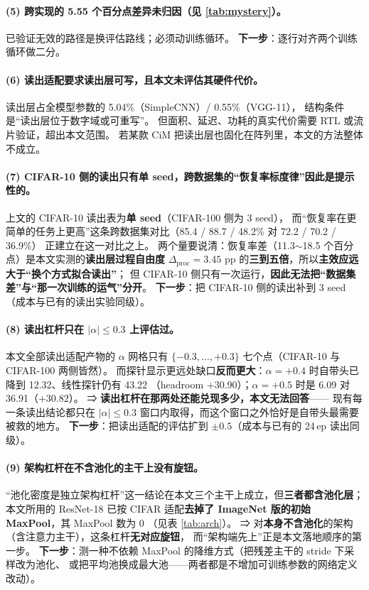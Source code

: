 \documentclass[11pt,a4paper]{ctexart}
\begin{document}
\paragraph{(5) 跨实现的 5.55 个百分点差异未归因（见 \cref{tab:mystery}）。}
已验证无效的路径是换评估路线；必须动训练循环。
\textbf{下一步}：逐行对齐两个训练循环做二分。

\paragraph{(6) 读出适配要求读出层可写，且本文未评估其硬件代价。}
读出层占全模型参数的 5.04\%（SimpleCNN）/ 0.55\%（VGG-11），
结构条件是“读出层位于数字域或可重写”。
但面积、延迟、功耗的真实代价需要 RTL 或流片验证，超出本文范围。
若某款 CiM 把读出层也固化在阵列里，本文的方法整体不成立。

\paragraph{(7) CIFAR-10 侧的读出只有单 seed，跨数据集的“恢复率标度律”因此是提示性的。}
上文的 CIFAR-10 读出表为\textbf{单 seed}（CIFAR-100 侧为 3 seed），
而“恢复率在更简单的任务上更高”这条跨数据集对比（85.4 / 88.7 / 48.2\% 对 72.2 / 70.2 / 36.9\%）
正建立在这一对比之上。
两个量要说清：恢复率差（11.3$\sim$18.5 个百分点）是本文实测的\textbf{读出层过程自由度}
$\Delta_{\text{proc}}=3.45$ pp 的\textbf{三到五倍}，所以\textbf{主效应远大于“换个方式拟合读出”}；
但 CIFAR-10 侧只有一次运行，\textbf{因此无法把“数据集差”与“那一次训练的运气”分开}。
\textbf{下一步}：把 CIFAR-10 侧的读出补到 3 seed（成本与已有的读出实验同级）。

\paragraph{(8) 读出杠杆只在 $|\alpha|\le0.3$ 上评估过。}
本文全部读出适配产物的 $\alpha$ 网格只有 $\{-0.3,\dots,+0.3\}$ 七个点（CIFAR-10 与 CIFAR-100 两侧皆然）。
而探针显示更远处缺口\textbf{反而更大}：$\alpha=+0.4$ 时自带头已降到 12.32、线性探针仍有 43.22
（headroom $+30.90$）；$\alpha=+0.5$ 时是 6.09 对 36.91（$+30.82$）。
⇒ \textbf{读出杠杆在那两处还能兑现多少，本文无法回答}——
现有每一条读出结论都只在 $|\alpha|\le0.3$ 窗口内取得，而这个窗口之外恰好是自带头最需要被救的地方。
\textbf{下一步}：把读出适配的评估扩到 $\pm0.5$（成本与已有的 24\,ep 读出同级）。

\paragraph{(9) 架构杠杆在不含池化的主干上没有旋钮。}
“池化密度是独立架构杠杆”这一结论在本文三个主干上成立，但\textbf{三者都含池化层}；
本文所用的 ResNet-18 已按 CIFAR 适配\textbf{去掉了 ImageNet 版的初始 MaxPool}，其 MaxPool 数为 0
（见表 \ref{tab:arch}）。
⇒ 对\textbf{本身不含池化}的架构（含注意力主干），这条杠杆\textbf{无对应旋钮}，
而“架构端先上”正是本文落地顺序的第一步。
\textbf{下一步}：测一种不依赖 MaxPool 的降维方式（把残差主干的 stride 下采样改为池化、
或把平均池换成最大池——两者都是不增加可训练参数的网络定义改动）。
\end{document}
